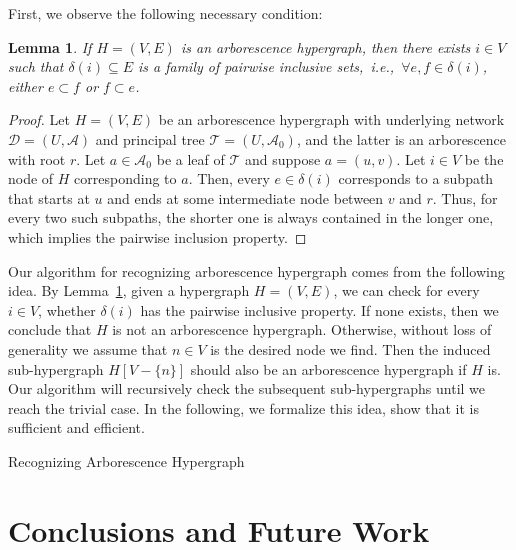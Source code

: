 \documentclass[11pt]{article}
\newtheorem{lemma}[theorem]{Lemma}
\begin{document}
First, we observe the following necessary condition:
\begin{lemma}\label{lem:inclusion}
    If $H=(V,E)$ is an arborescence hypergraph, then there exists $i\in V$ such that $\delta(i)\subseteq E$ is a family of pairwise inclusive sets,~i.e.,~$\forall e,f\in\delta(i)$, either $e\subset f$ or $f\subset e$.
\end{lemma}
\begin{proof}
    Let $H=(V,E)$ be an arborescence hypergraph with underlying network $\mathcal{D}=(U,\mathcal{A})$ and principal tree $\mathcal{T}=(U,\mathcal{A}_0)$, and the latter is an arborescence with root $r$. Let $a\in\mathcal{A}_0$ be a leaf of $\mathcal{T}$ and suppose $a=(u,v)$. Let $i\in V$ be the node of $H$ corresponding to $a$. Then, every $e\in\delta(i)$ corresponds to a subpath that starts at $u$ and ends at some intermediate node between $v$ and $r$. Thus, for every two such subpaths, the shorter one is always contained in the longer one, which implies the pairwise inclusion property.
\end{proof}
Our algorithm for recognizing arborescence hypergraph comes from the following idea. By Lemma~\ref{lem:inclusion}, given a hypergraph $H=(V,E)$, we can check for every $i\in V$, whether $\delta(i)$ has the pairwise inclusive property. If none exists, then we conclude that $H$ is not an arborescence hypergraph. Otherwise, without loss of generality we assume that $n\in V$ is the desired node we find. Then the induced sub-hypergraph $H[V-\{n\}]$ should also be an arborescence hypergraph if $H$ is. Our algorithm will recursively check the subsequent sub-hypergraphs until we reach the trivial case. In the following, we formalize this idea, show that it is sufficient and efficient.

\begin{algorithm}
\caption{Recognizing Arborescence Hypergraph}\label{alg:reco}
\begin{algorithmic}
\end{algorithmic}
\end{algorithm}

\fi

\section{Conclusions and Future Work}
\end{document}
